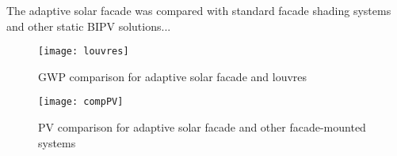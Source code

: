 
The adaptive solar facade was compared with standard facade shading systems and other static BIPV solutions...

\begin{figure}[H]
\begin{center}
\texttt{[image: louvres]}
\caption{GWP comparison for adaptive solar facade and louvres}
\label{fig:louvres}
\end{center}
\end{figure}

\begin{figure}[H]
\begin{center}
\texttt{[image: compPV]}
\caption{PV comparison for adaptive solar facade and other facade-mounted systems}
\label{fig:compPV}
\end{center}
\end{figure}